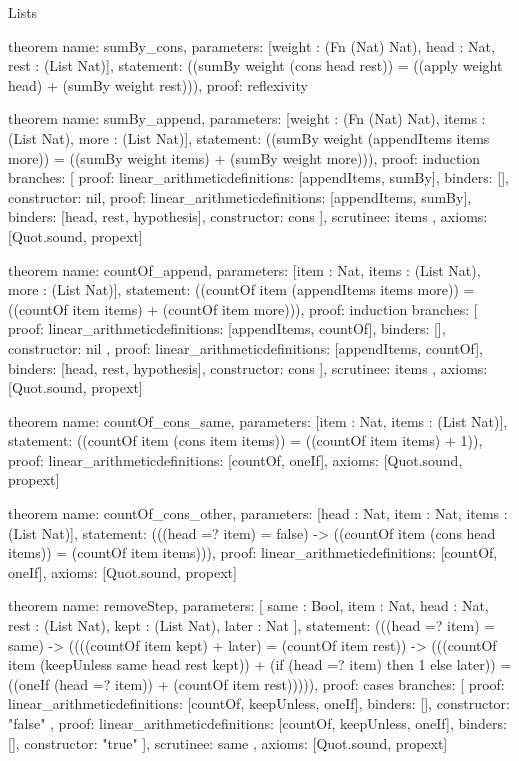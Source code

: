 \begin{lexlean}{Lists}
\begin{semanticmodule}
theorem{
  name: sumBy_cons,
  parameters: [weight : (Fn (Nat) Nat), head : Nat, rest : (List Nat)],
  statement: ((sumBy weight (cons head rest)) = ((apply weight head) + (sumBy weight rest))),
  proof: reflexivity{}
}

theorem{
  name: sumBy_append,
  parameters: [weight : (Fn (Nat) Nat), items : (List Nat), more : (List Nat)],
  statement: ((sumBy weight (appendItems items more)) = ((sumBy weight items) + (sumBy weight more))),
  proof: induction{
    branches: [
      {proof: linear_arithmetic{definitions: [appendItems, sumBy]}, binders: [], constructor: nil},
      {
        proof: linear_arithmetic{definitions: [appendItems, sumBy]},
        binders: [head, rest, hypothesis],
        constructor: cons
      }
    ],
    scrutinee: items
  },
  axioms: [Quot.sound, propext]
}

theorem{
  name: countOf_append,
  parameters: [item : Nat, items : (List Nat), more : (List Nat)],
  statement: ((countOf item (appendItems items more)) = ((countOf item items) + (countOf item more))),
  proof: induction{
    branches: [
      {
        proof: linear_arithmetic{definitions: [appendItems, countOf]},
        binders: [],
        constructor: nil
      },
      {
        proof: linear_arithmetic{definitions: [appendItems, countOf]},
        binders: [head, rest, hypothesis],
        constructor: cons
      }
    ],
    scrutinee: items
  },
  axioms: [Quot.sound, propext]
}

theorem{
  name: countOf_cons_same,
  parameters: [item : Nat, items : (List Nat)],
  statement: ((countOf item (cons item items)) = ((countOf item items) + 1)),
  proof: linear_arithmetic{definitions: [countOf, oneIf]},
  axioms: [Quot.sound, propext]
}

theorem{
  name: countOf_cons_other,
  parameters: [head : Nat, item : Nat, items : (List Nat)],
  statement: (((head =? item) = false) -> ((countOf item (cons head items)) = (countOf item items))),
  proof: linear_arithmetic{definitions: [countOf, oneIf]},
  axioms: [Quot.sound, propext]
}

theorem{
  name: removeStep,
  parameters: [
    same : Bool,
    item : Nat,
    head : Nat,
    rest : (List Nat),
    kept : (List Nat),
    later : Nat
  ],
  statement: (((head =? item) = same) -> ((((countOf item kept) + later) = (countOf item rest)) -> (((countOf item (keepUnless same head rest kept)) + (if (head =? item) then 1 else later)) = ((oneIf (head =? item)) + (countOf item rest))))),
  proof: cases{
    branches: [
      {
        proof: linear_arithmetic{definitions: [countOf, keepUnless, oneIf]},
        binders: [],
        constructor: "false"
      },
      {
        proof: linear_arithmetic{definitions: [countOf, keepUnless, oneIf]},
        binders: [],
        constructor: "true"
      }
    ],
    scrutinee: same
  },
  axioms: [Quot.sound, propext]
}


\end{semanticmodule}
\end{lexlean}
